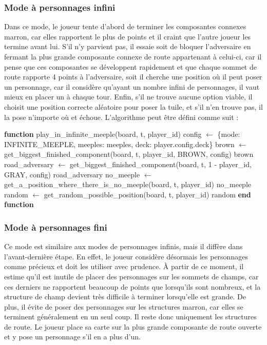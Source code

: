 \subsubsection{Mode à personnages infini}

Dans ce mode, le joueur tente d'abord de terminer les composantes connexes marron, car elles rapportent le plus de points et il craint que l'autre joueur les termine avant lui. S'il n'y parvient pas, il essaie soit de bloquer l'adversaire en fermant la plus grande composante connexe de route appartenant à celui-ci, car il pense que ces composantes se développent rapidement et que chaque sommet de route rapporte 4 points à l'adversaire, soit il cherche une position où il peut poser un personnage, car il considère qu'ayant un nombre infini de personnages, il vaut mieux en placer un à chaque tour. Enfin, s'il ne trouve aucune option viable, il choisit une position correcte aléatoire pour poser la tuile, et s'il n'en trouve pas, il la pose n'importe où et échoue. L'algorithme peut être défini comme suit :

\begin{algorithm}[H]
\caption{play\_in\_infinite\_meeple}
\begin{algorithmic}[1]
\STATE \textbf{function} play\_in\_infinite\_meeple(board, t, player\_id)
    \STATE config $\gets$ \{mode: INFINITE\_MEEPLE, meeples: meeples, deck: player.config.deck\}
    \STATE brown $\gets$ get\_biggest\_finished\_component(board, t, player\_id, BROWN, config)
        \RETURN brown
    \ENDIF
        \STATE road\_adversary $\gets$ get\_biggest\_finished\_component(board, t, 1 - player\_id, GRAY, config)
            \RETURN road\_adversary
        \ENDIF
    \ELSE
        \STATE no\_meeple $\gets$ get\_a\_position\_where\_there\_is\_no\_meeple(board, t, player\_id)
            \RETURN no\_meeple
        \ENDIF
    \ENDIF
    \STATE random $\gets$ get\_random\_possible\_position(board, t, player\_id)
    \RETURN random
\STATE \textbf{end function}
\end{algorithmic}
\end{algorithm}\subsubsection{Mode à personnages fini}

Ce mode est similaire aux modes de personnages infinis, mais il diffère dans l'avant-dernière étape. En effet, le joueur considère désormais les personnages comme précieux et doit les utiliser avec prudence. À partir de ce moment, 
 il estime qu'il est inutile de placer des personnages sur les sommets de champs, car ces derniers ne rapportent beaucoup de points que lorsqu'ils sont nombreux, et la structure de champ devient très difficile à terminer lorsqu'elle est grande. De plus, il évite de poser des personnages sur les structures marron, car elles se terminent généralement en un seul coup. Il reste donc uniquement les structures de route. Le joueur place sa carte sur la plus grande composante de route ouverte et y pose un personnage s'il en a plus d'un.

